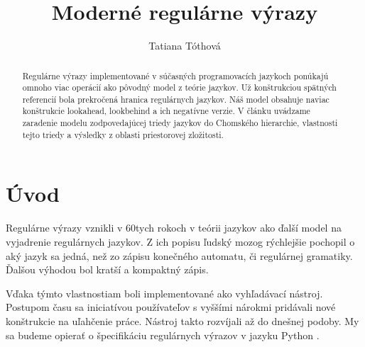 \documentclass{svk_long_sk}
\begin{document}
\title{Moderné regulárne výrazy}

\author{Tatiana Tóthová
}




\maketitle

\begin{abstract}
Regulárne výrazy implementované v súčasných programovacích jazykoch ponúkajú omnoho viac operácií ako pôvodný model z teórie jazykov. Už konštrukciou spätných referencií bola prekročená hranica regulárnych jazykov. Náš model obsahuje naviac konštrukcie lookahead, lookbehind a ich negatívne verzie. V článku uvádzame zaradenie modelu zodpovedajúcej triedy jazykov do Chomského hierarchie, vlastnosti tejto triedy a výsledky z oblasti priestorovej zložitosti.

\end{abstract}

\section{Úvod}
Regulárne výrazy vznikli v 60tych rokoch v teórii jazykov ako ďalší model na vyjadrenie regulárnych jazykov. Z ich popisu ľudský mozog rýchlejšie pochopil o aký jazyk sa jedná, než zo zápisu konečného automatu, či regulárnej gramatiky. Ďalšou výhodou bol kratší a kompaktný zápis.

Vďaka týmto vlastnostiam boli implementované ako vyhľadávací nástroj. Postupom času sa iniciatívou používateľov s vyššími nárokmi pridávali nové konštrukcie na uľahčenie práce. Nástroj takto rozvíjali až do dnešnej podoby. My sa budeme opierať o špecifikáciu regulárnych výrazov v jazyku Python \cite{Python3Documentation}.
\end{document}
